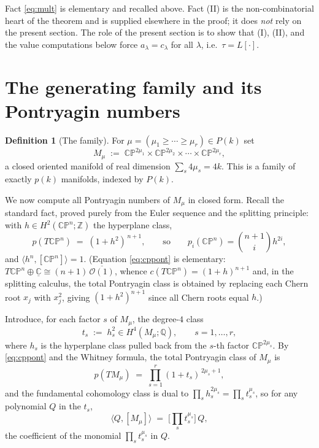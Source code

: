 \documentclass[12pt]{article}
\theoremstyle{definition}
\newtheorem{definition}{Definition}
\begin{document}
\noindent
Fact \eqref{eq:mult} is elementary and recalled above.  Fact (II) is the
non-combinatorial heart of the theorem and is supplied elsewhere in the proof; it does
\emph{not} rely on the present section.  The role of the present section is to show that
(I), (II), and the value computations below force $a_\lambda=c_\lambda$ for all
$\lambda$, i.e.\ $\tau=L[\cdot]$.

\bigskip

\section{The generating family and its Pontryagin numbers}

\begin{definition}[The family]\label{def:family}
For $\mu=(\mu_1\ge\cdots\ge\mu_r)\in P(k)$ set
\[
M_\mu\;:=\;\mathbb{CP}^{2\mu_1}\times\mathbb{CP}^{2\mu_2}\times\cdots\times
\mathbb{CP}^{2\mu_r},
\]
a closed oriented manifold of real dimension $\sum_s 4\mu_s=4k$.  This is a family of
exactly $p(k)$ manifolds, indexed by $P(k)$.
\end{definition}

We now compute all Pontryagin numbers of $M_\mu$ in closed form.  Recall the standard
fact, proved purely from the Euler sequence and the splitting principle: with
$h\in H^2(\mathbb{CP}^n;\mathbb{Z})$ the hyperplane class,
\[
p(T\mathbb{CP}^n)\;=\;(1+h^2)^{\,n+1},
\qquad\text{so}\qquad
p_i(\mathbb{CP}^n)=\binom{n+1}{i}h^{2i},
\tag{3}\label{eq:cppont}
\]
and $\langle h^n,[\mathbb{CP}^n]\rangle=1$.  (Equation \eqref{eq:cppont} is elementary:
$T\mathbb{CP}^n\oplus\underline{\mathbb{C}}\cong(n+1)\,\overline{\mathcal{O}(1)}$, whence
$c(T\mathbb{CP}^n)=(1+h)^{n+1}$ and, in the splitting calculus, the total Pontryagin
class is obtained by replacing each Chern root $x_j$ with $x_j^2$, giving
$(1+h^2)^{n+1}$ since all Chern roots equal $h$.)

Introduce, for each factor $s$ of $M_\mu$, the degree-$4$ class
\[
t_s\;:=\;h_s^2\in H^4(M_\mu;\mathbb{Q}),
\qquad s=1,\dots,r,
\]
where $h_s$ is the hyperplane class pulled back from the $s$-th factor
$\mathbb{CP}^{2\mu_s}$.  By \eqref{eq:cppont} and the Whitney formula, the total
Pontryagin class of $M_\mu$ is
\[
p(TM_\mu)\;=\;\prod_{s=1}^{r}(1+t_s)^{\,2\mu_s+1},
\tag{4}\label{eq:prodp}
\]
and the fundamental cohomology class is dual to $\prod_s h_s^{2\mu_s}=\prod_s t_s^{\mu_s}$,
so for any polynomial $Q$ in the $t_s$,
\[
\langle Q,[M_\mu]\rangle\;=\;\big[\textstyle\prod_s t_s^{\mu_s}\big]\,Q,
\tag{5}\label{eq:pair}
\]
the coefficient of the monomial $\prod_s t_s^{\mu_s}$ in $Q$.
\end{document}
